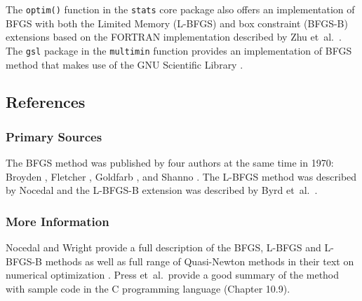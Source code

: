 The \texttt{optim()} function in the \texttt{stats} core package also offers an implementation of BFGS with both the Limited Memory (L-BFGS) and box constraint (BFGS-B) extensions based on the FORTRAN implementation described by Zhu et~al.\ \cite{Zhu1997}. The \texttt{gsl} package in the \texttt{multimin} function provides an implementation of BFGS method that makes use of the GNU Scientific Library \cite{Hankin2011}.

\subsection{References}

\subsubsection{Primary Sources}
The BFGS method was published by four authors at the same time in 1970: Broyden \cite{Broyden1970}, Fletcher \cite{Fletcher1970}, Goldfarb \cite{Goldfarb1970}, and Shanno \cite{Shanno1970}.
The L-BFGS method was described by Nocedal \cite{Nocedal1980} and the L-BFGS-B extension was described by Byrd et~al.\ \cite{Byrd1995}.

\subsubsection{More Information}
Nocedal and Wright provide a full description of the BFGS, L-BFGS and L-BFGS-B methods as well as full range of Quasi-Newton methods in their text on numerical optimization \cite{Nocedal1999}.
Press et~al.\ provide a good summary of the method with sample code in the C programming language \cite{Press2007} (Chapter 10.9).




